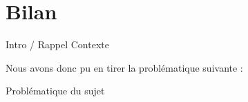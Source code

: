 \chapter{Bilan}

Intro / Rappel Contexte

Nous avons donc pu en tirer la problématique suivante :

\begin{center}
\hskip7mm
Problématique du sujet
\end{center}

\lipsum[1]